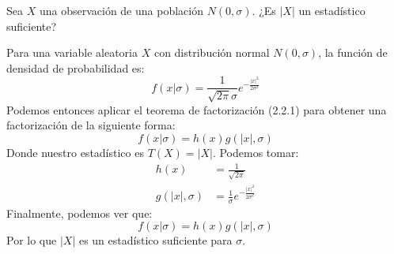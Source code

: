\begin{ejercicio}[Ejercicio 2.7.1]
    Sea $X$ una observación de una población $N(0, \sigma)$. ¿Es $|X|$ un estadístico suficiente?
\end{ejercicio}

\begin{solucion}
    Para una variable aleatoria $X$ con distribución normal $N(0, \sigma)$, la función de densidad de probabilidad es:
    \begin{equation}
        f(x|\sigma) = \frac{1}{\sqrt{2\pi}\sigma}e^{-\frac{|x|^2}{2\sigma^2}}
    \end{equation}
    Podemos entonces aplicar el teorema de factorización (2.2.1) para obtener una factorización de la siguiente forma:
    \begin{equation}
        f(x|\sigma) = h(x)g(|x|, \sigma)
    \end{equation}
    Donde nuestro estadístico es $T(X) = |X|$. Podemos tomar:
    \begin{align}
        h(x) &= \frac{1}{\sqrt{2\pi}} \\
        g(|x|, \sigma) &= \frac{1}{\sigma} e^{-\frac{|x|^2}{2\sigma^2}}
    \end{align}
    Finalmente, podemos ver que:
    \begin{equation}
        f(x|\sigma) = h(x)g(|x|, \sigma)
    \end{equation}
    Por lo que $|X|$ es un estadístico suficiente para $\sigma$.
\end{solucion}